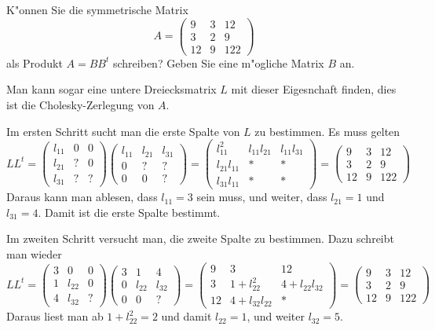 K"onnen Sie die symmetrische Matrix
\[
A=\begin{pmatrix}
 9& 3& 12\\
 3& 2&  9\\
12& 9&122
\end{pmatrix}
\]
als Produkt $A=BB^t$ schreiben? Geben Sie eine m"ogliche Matrix $B$ an.

\begin{loesung}
Man kann sogar eine untere Dreiecksmatrix $L$ mit dieser Eigesnchaft finden,
dies ist die Cholesky-Zerlegung von $A$.

Im ersten Schritt sucht man die erste Spalte von $L$ zu bestimmen.
Es muss gelten
\[
LL^t=
\begin{pmatrix}
l_{11}&  0&  0\\
l_{21}&  ?&  0\\
l_{31}&  ?&  ?
\end{pmatrix}
\begin{pmatrix}
l_{11}&l_{21}&l_{31}\\
     0&     ?&     ?\\
     0&     0&     ?
\end{pmatrix}
=
\begin{pmatrix}
    l_{11}^2&l_{11}l_{21}&l_{11}l_{31}\\
l_{21}l_{11}&           *&           *\\
l_{31}l_{11}&           *&           *
\end{pmatrix}
=
\begin{pmatrix}
 9& 3& 12\\
 3& 2&  9\\
12& 9&122
\end{pmatrix}
\]
Daraus kann man ablesen, dass $l_{11}=3$ sein muss, und weiter,
dass
$l_{21}=1$ und $l_{31}=4$. Damit ist die erste Spalte bestimmt.

Im zweiten Schritt versucht man, die zweite Spalte zu bestimmen.
Dazu schreibt man wieder
\[
LL^t
=
\begin{pmatrix}
3&     0&0\\
1&l_{22}&0\\
4&l_{32}&?
\end{pmatrix}
\begin{pmatrix}
3&     1&     4\\
0&l_{22}&l_{32}\\
0&     0&?
\end{pmatrix}
=
\begin{pmatrix}
 9&3           &          12\\
 3& 1+l_{22}^2  &4+l_{22}l_{32}\\
12& 4+l_{32}l_{22}&         *
\end{pmatrix}
=
\begin{pmatrix}
 9& 3& 12\\
 3& 2&  9\\
12& 9&122
\end{pmatrix}
\]
Daraus liest man ab $1+l_{22}^2=2$ und damit $l_{22}=1$, und weiter
$l_{32}=5$.


\end{loesung}
